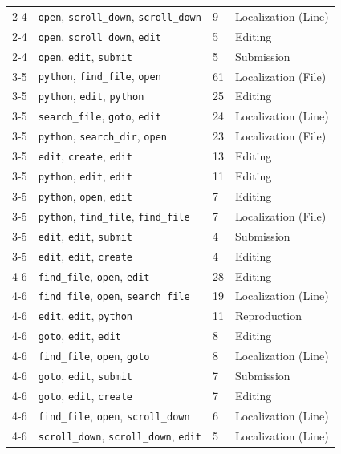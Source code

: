 \begin{table}
\begin{tabular}{llll}
2-4 & \texttt{open}, \texttt{scroll\_down}, \texttt{scroll\_down} & 9 & Localization (Line) \\
2-4 & \texttt{open}, \texttt{scroll\_down}, \texttt{edit} & 5 & Editing \\
2-4 & \texttt{open}, \texttt{edit}, \texttt{submit} & 5 & Submission \\
3-5 & \texttt{python}, \texttt{find\_file}, \texttt{open} & 61 & Localization (File) \\
3-5 & \texttt{python}, \texttt{edit}, \texttt{python} & 25 & Editing \\
3-5 & \texttt{search\_file}, \texttt{goto}, \texttt{edit} & 24 & Localization (Line) \\
3-5 & \texttt{python}, \texttt{search\_dir}, \texttt{open} & 23 & Localization (File) \\
3-5 & \texttt{edit}, \texttt{create}, \texttt{edit} & 13 & Editing \\
3-5 & \texttt{python}, \texttt{edit}, \texttt{edit} & 11 & Editing \\
3-5 & \texttt{python}, \texttt{open}, \texttt{edit} & 7 & Editing \\
3-5 & \texttt{python}, \texttt{find\_file}, \texttt{find\_file} & 7 & Localization (File) \\
3-5 & \texttt{edit}, \texttt{edit}, \texttt{submit} & 4 & Submission \\
3-5 & \texttt{edit}, \texttt{edit}, \texttt{create} & 4 & Editing \\
4-6 & \texttt{find\_file}, \texttt{open}, \texttt{edit} & 28 & Editing \\
4-6 & \texttt{find\_file}, \texttt{open}, \texttt{search\_file} & 19 & Localization (Line) \\
4-6 & \texttt{edit}, \texttt{edit}, \texttt{python} & 11 & Reproduction \\
4-6 & \texttt{goto}, \texttt{edit}, \texttt{edit} & 8 & Editing \\
4-6 & \texttt{find\_file}, \texttt{open}, \texttt{goto} & 8 & Localization (Line) \\
4-6 & \texttt{goto}, \texttt{edit}, \texttt{submit} & 7 & Submission \\
4-6 & \texttt{goto}, \texttt{edit}, \texttt{create} & 7 & Editing \\
4-6 & \texttt{find\_file}, \texttt{open}, \texttt{scroll\_down} & 6 & Localization (Line) \\
4-6 & \texttt{scroll\_down}, \texttt{scroll\_down}, \texttt{edit} & 5 & Localization (Line) \\

\end{tabular}
\end{table}
